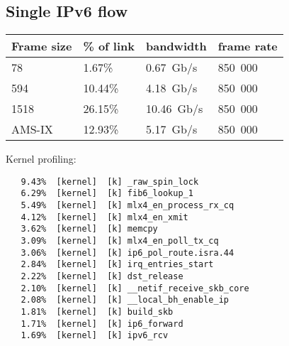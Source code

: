 
\subsection{Single IPv6 flow}

\begin{tabular}{ | l | l | l | l | }
\hline
Frame size & \% of link & bandwidth & frame rate \\
\hline
78     &  1.67\% &  0.67~Gb/s & 850~000 \\
594    & 10.44\% &  4.18~Gb/s & 850~000 \\
1518   & 26.15\% & 10.46~Gb/s & 850~000 \\
AMS-IX & 12.93\% &  5.17~Gb/s & 850~000 \\
\hline
\end{tabular}

Kernel profiling:
\begin{lstlisting}
   9.43%  [kernel]  [k] _raw_spin_lock
   6.29%  [kernel]  [k] fib6_lookup_1
   5.49%  [kernel]  [k] mlx4_en_process_rx_cq
   4.12%  [kernel]  [k] mlx4_en_xmit
   3.62%  [kernel]  [k] memcpy
   3.09%  [kernel]  [k] mlx4_en_poll_tx_cq
   3.06%  [kernel]  [k] ip6_pol_route.isra.44
   2.84%  [kernel]  [k] irq_entries_start
   2.22%  [kernel]  [k] dst_release
   2.10%  [kernel]  [k] __netif_receive_skb_core
   2.08%  [kernel]  [k] __local_bh_enable_ip
   1.81%  [kernel]  [k] build_skb
   1.71%  [kernel]  [k] ip6_forward
   1.69%  [kernel]  [k] ipv6_rcv
\end{lstlisting}

